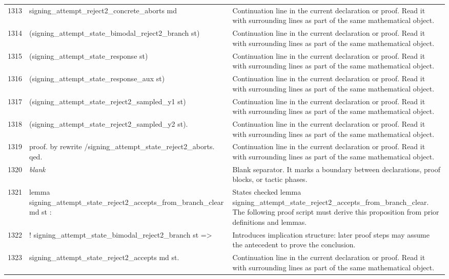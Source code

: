 \documentclass[10pt]{article}
\begin{document}
\begin{longtable}{r L{0.53\textwidth} L{0.37\textwidth}}
1313 & {\ttfamily\scriptsize   signing\_attempt\_reject2\_concrete\_aborts md} & Continuation line in the current declaration or proof.  Read it with surrounding lines as part of the same mathematical object. \\
1314 & {\ttfamily\scriptsize     (signing\_attempt\_state\_bimodal\_reject2\_branch st)} & Continuation line in the current declaration or proof.  Read it with surrounding lines as part of the same mathematical object. \\
1315 & {\ttfamily\scriptsize     (signing\_attempt\_state\_response st)} & Continuation line in the current declaration or proof.  Read it with surrounding lines as part of the same mathematical object. \\
1316 & {\ttfamily\scriptsize     (signing\_attempt\_state\_response\_aux st)} & Continuation line in the current declaration or proof.  Read it with surrounding lines as part of the same mathematical object. \\
1317 & {\ttfamily\scriptsize     (signing\_attempt\_state\_reject2\_sampled\_y1 st)} & Continuation line in the current declaration or proof.  Read it with surrounding lines as part of the same mathematical object. \\
1318 & {\ttfamily\scriptsize     (signing\_attempt\_state\_reject2\_sampled\_y2 st).} & Continuation line in the current declaration or proof.  Read it with surrounding lines as part of the same mathematical object. \\
1319 & {\ttfamily\scriptsize proof. by rewrite /signing\_attempt\_state\_reject2\_aborts. qed.} & Continuation line in the current declaration or proof.  Read it with surrounding lines as part of the same mathematical object. \\
1320 & {\ttfamily\scriptsize \emph{blank}} & Blank separator.  It marks a boundary between declarations, proof blocks, or tactic phases. \\
1321 & {\ttfamily\scriptsize lemma signing\_attempt\_state\_reject2\_accepts\_from\_branch\_clear md st :} & States checked lemma signing\_attempt\_state\_reject2\_accepts\_from\_branch\_clear.  The following proof script must derive this proposition from prior definitions and lemmas. \\
1322 & {\ttfamily\scriptsize   ! signing\_attempt\_state\_bimodal\_reject2\_branch st =>} & Introduces implication structure: later proof steps may assume the antecedent to prove the conclusion. \\
1323 & {\ttfamily\scriptsize   signing\_attempt\_state\_reject2\_accepts md st.} & Continuation line in the current declaration or proof.  Read it with surrounding lines as part of the same mathematical object. \\

\end{longtable}
\end{document}
